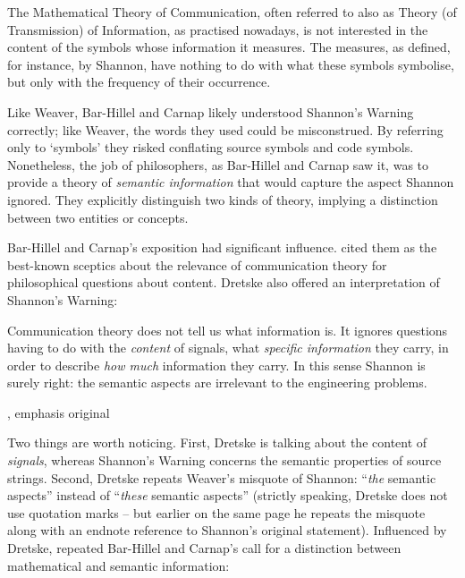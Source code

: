 \begin{myquote}
The Mathematical Theory of Communication, often referred to also as Theory (of Transmission) of Information, as practised nowadays, is not interested in the content of the symbols whose information it measures. The measures, as defined, for instance, by Shannon, have nothing to do with what these symbols symbolise, but only with the frequency of their occurrence.
\par\hspace*{\fill}\citet[147]{bar-hillel1953semantic}
\end{myquote}

\noindent Like Weaver, Bar-Hillel and Carnap likely understood {\sc Shannon's Warning} correctly; like Weaver, the words they used could be misconstrued.
By referring only to `symbols' they risked conflating source symbols and code symbols.
Nonetheless, the job of philosophers, as Bar-Hillel and Carnap saw it, was to provide a theory of \textit{semantic information} that would capture the aspect Shannon ignored.
They explicitly distinguish two kinds of theory, implying a distinction between two entities or concepts.

Bar-Hillel and Carnap's exposition had significant influence.
\citet[p. 241, n.
1]{dretske1981knowledge} cited them as the best-known sceptics about the relevance of communication theory for philosophical questions about content.
Dretske also offered an interpretation of {\sc Shannon's Warning}:

\begin{myquote}
Communication theory does not tell us what information is.
It ignores questions having to do with the \emph{content} of signals, what \emph{specific information} they carry, in order to describe \emph{how much} information they carry.
In this sense Shannon is surely right: the semantic aspects are irrelevant to the engineering problems.
\par\hspace*{\fill}\citet[41]{dretske1981knowledge}, emphasis original
\end{myquote}

\noindent Two things are worth noticing.
First, Dretske is talking about the content of \textit{signals}, whereas {\sc Shannon's Warning} concerns the semantic properties of source strings.
Second, Dretske repeats Weaver's misquote of Shannon: ``\textit{the} semantic aspects'' instead of ``\textit{these} semantic aspects'' (strictly speaking, Dretske does not use quotation marks -- but earlier on the same page he repeats the misquote along with an endnote reference to Shannon's original statement).
Influenced by Dretske, \citet{dennett1983intentional} repeated Bar-Hillel and Carnap's call for a distinction between mathematical and semantic information:

